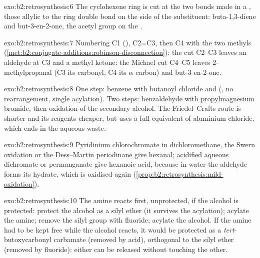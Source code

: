 \begin{solution}{exo:b2:retrosynthesis:6}
The cyclohexene ring is cut at the two  bonds made in a , those
allylic to the ring double bond on the side of the substituent: buta-1,3-diene and but-3-en-2-one, the
acetyl group on the .
\end{solution}

\begin{solution}{exo:b2:retrosynthesis:7}
Numbering C1 (), C2=C3, then C4 with the two methyls
(\cref{met:b2:conjugate-additions:robinson-disconnection}): the  cut C2--C3 leaves an aldehyde
at C3 and a methyl ketone; the Michael cut C4--C5 leaves 2-methylpropanal (C3 its carbonyl, C4 its
$\alpha$ carbon) and but-3-en-2-one.
\end{solution}

\begin{solution}{exo:b2:retrosynthesis:8}
One step: benzene with butanoyl chloride and  (, no rearrangement,
single acylation). Two steps: benzaldehyde with propylmagnesium bromide, then oxidation of the secondary
alcohol. The Friedel--Crafts route is shorter and its reagents cheaper, but uses a full equivalent of
aluminium chloride, which ends in the aqueous waste.
\end{solution}

\begin{solution}{exo:b2:retrosynthesis:9}
Pyridinium chlorochromate in dichloromethane, the Swern oxidation or the Dess--Martin periodinane
give hexanal; acidified aqueous dichromate or permanganate give hexanoic acid, because in water the
aldehyde forms its hydrate, which is oxidised again (\cref{prop:b2:retrosynthesis:mild-oxidation}).
\end{solution}

\begin{solution}{exo:b2:retrosynthesis:10}
The amine reacts first, unprotected, if the alcohol is protected: protect the alcohol as a silyl ether
(it survives the acylation); acylate the amine; remove the silyl group with fluoride; acylate the
alcohol. If the amine had to be kept free while the alcohol reacts, it would be protected as a
\textit{tert}-butoxycarbonyl carbamate (removed by acid), orthogonal to the silyl ether (removed by
fluoride): either can be released without touching the other.
\end{solution}

